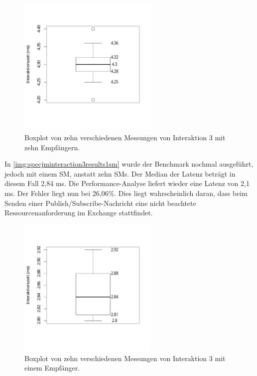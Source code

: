\begin{figure}
\center
  \includegraphics[width=0.6\textwidth]{images/evaluation/specjmsresults/interaktion3-10SM.pdf}
  \caption{Boxplot von zehn verschiedenen Messungen von Interaktion 3 mit zehn Empfängern.}
  \label{img:specjminteraction3results10sm}
\end{figure}

In \autoref{img:specjminteraction3results1sm} wurde der Benchmark nochmal ausgeführt, jedoch mit einem SM, anstatt zehn SMs. Der Median der Latenz beträgt in diesem Fall 2,84 ms. Die Performance-Analyse liefert wieder eine Latenz von 2,1 ms. Der Fehler liegt nun bei 26,06\%. Dies liegt wahrscheinlich daran, dass beim Senden einer Publish/Subscribe-Nachricht eine nicht beachtete Ressourcenanforderung im Exchange stattfindet.
\begin{figure}
\center
  \includegraphics[width=0.6\textwidth]{images/evaluation/specjmsresults/interaktion3-1SM.pdf}
  \caption{Boxplot von zehn verschiedenen Messungen von Interaktion 3 mit einem Empfänger.}
  \label{img:specjminteraction3results1sm}
\end{figure}


